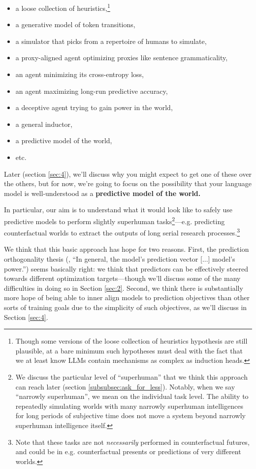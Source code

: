 \documentclass[
  onecolumn,
  nonatbib,
]{miri-tech-article}
\begin{document}
\begin{itemize}
\item a loose collection of heuristics,\footnote{Though some versions of the loose collection of heuristics hypothesis are still plausible, at a bare minimum such hypotheses must deal with the fact that we at least know LLMs contain mechanisms as complex as induction heads\cite{induction-heads}.}
\item a generative model of token transitions,
\item a simulator that picks from a repertoire of humans to simulate,
\item a proxy-aligned agent optimizing proxies like sentence grammaticality,
\item an agent minimizing its cross-entropy loss,
\item an agent maximizing long-run predictive accuracy,
\item a deceptive agent trying to gain power in the world,
\item a general inductor,
\item a predictive model of the world,
\item etc.
\end{itemize}

Later (section \ref{sec:4}), we'll discuss why you might expect to get one of these over the others, but for now, we're going to focus on the possibility that your language model is well-understood as a \textbf{predictive model of the world.}

In particular, our aim is to understand what it would look like to safely use predictive models to perform slightly superhuman tasks\footnote{We discuss the particular level of ``superhuman'' that we think this approach can reach later (section \ref{subsubsec:ask_for_less}). Notably, when we say ``narrowly superhuman'', we mean on the individual task level. The ability to repeatedly simulating worlds with many narrowly superhuman intelligences for long periods of subjective time does not move a system beyond narrowly superhuman intelligence itself.}---e.g. predicting counterfactual worlds to extract the outputs of long serial research processes.\footnote{Note that these tasks are not \textit{necessarily} performed in counterfactual futures, and could be in e.g. counterfactual presents or predictions of very different worlds.}



We think that this basic approach has hope for two reasons. First, the prediction orthogonality thesis (\cite{simulators}, ``In general, the model’s prediction vector [...] model’s power.'') seems basically right: we think that predictors can be effectively steered towards different optimization targets---though we'll discuss some of the many difficulties in doing so in Section \ref{sec:2}. Second, we think there is substantially more hope of being able to inner align\cite{risks} models to prediction objectives than other sorts of training goals\cite{how_become_confident} due to the simplicity of such objectives, as we'll discuss in Section \ref{sec:4}.
\end{document}
